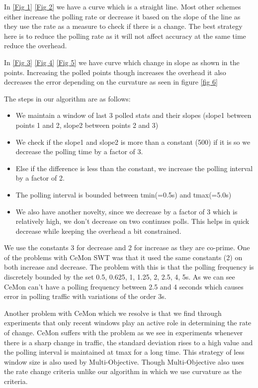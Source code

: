 
In \ref{Fig 1} \ref{Fig 2} we have a curve which is a straight line.
Most other schemes either increase the polling rate or decrease it based on the slope of the line as they use the rate as a measure to check if there is a change.
The best strategy here is to reduce the polling rate as it will not affect accuracy at the same time reduce the overhead.

In \ref{Fig 3} \ref{Fig 4} \ref{Fig 5} we have curve which change in slope as shown in the points.
Increasing the polled points though increases the overhead it also decreases the error depending on the curvature as seen in figure \ref{fig 6}

The steps in our algorithm are as follows:
\begin{itemize}
    \item We maintain a window of last 3 polled stats and their slopes (slope1 between points 1 and 2, slope2 between points 2 and 3)
    \item We check if the slope1 and slope2 is more than a constant (500) if it is so we decrease the polling time by a factor of 3.
    \item Else if the difference is less than the constant, we increase the polling interval by a factor of 2.
    \item The polling interval is bounded between tmin(=0.5s) and tmax(=5.0s)
    \item We also have another novelty, since we decrease by a factor of 3 which is relatively high, we don't decrease on two continues polls. This helps in quick decrease while keeping the overhead a bit constrained. 
\end{itemize}

We use the constants 3 for decrease and 2 for increase as they are co-prime.
One of the problems with CeMon SWT \cite{cemon} was that it used the same constants (2) on both increase and decrease.
The problem with this is that the polling frequency is discretely bounded by the set {0.5, 0.625, 1, 1.25, 2, 2.5, 4, 5}s.
As we can see CeMon can't have a polling frequency between 2.5 and 4 seconds which causes error in polling traffic with variations of the order 3s.

Another problem with CeMon which we resolve is that we find through experiments that only recent windows play an active role in determining the rate of change.
CeMon suffers with the problem as we see in experiments whenever there is a sharp change in traffic, the standard deviation rises to a high value and the polling interval is maintained at tmax for a long time.
This strategy of less window size is also used by Multi-Objective. 
Though Multi-Objective also uses the rate change criteria unlike our algorithm in which we use curvature as the criteria.